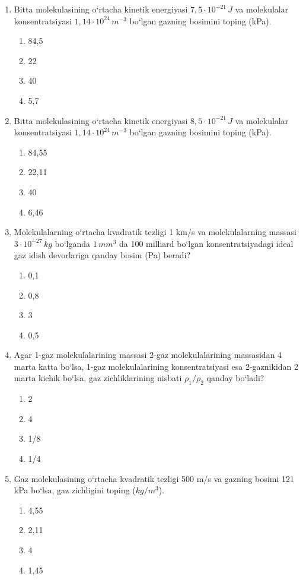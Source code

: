 \begin{enumerate}
\item Bitta molekulasining o‘rtacha kinetik energiyasi $7,5 \cdot 10^{-21} \, J$ va molekulalar konsentratsiyasi $1,14 \cdot 10^{24} \, m^{-3}$ bo‘lgan gazning bosimini toping (kPa).
\begin{enumerate}[label=\Alph*)]
\item 84,5
\item 22
\item 40
\item 5,7
\end{enumerate}

\item Bitta molekulasining o‘rtacha kinetik energiyasi $8,5 \cdot 10^{-21} \, J$ va molekulalar konsentratsiyasi $1,14 \cdot 10^{24} \, m^{-3}$ bo‘lgan gazning bosimini toping (kPa).
\begin{enumerate}[label=\Alph*)]
\item 84,55
\item 22,11
\item 40
\item 6,46
\end{enumerate}

\item Molekulalarning o‘rtacha kvadratik tezligi 1 km/s va molekulalarning massasi $3 \cdot 10^{-27} \, kg$ bo‘lganda $1 \, mm^3$ da 100 milliard bo‘lgan konsentratsiyadagi ideal gaz idish devorlariga qanday bosim (Pa) beradi?
\begin{enumerate}[label=\Alph*)]
\item 0,1
\item 0,8
\item 3
\item 0,5
\end{enumerate}

\item Agar 1-gaz molekulalarining massasi 2-gaz molekulalarining massasidan 4 marta katta bo‘lsa, 1-gaz molekulalarining konsentratsiyasi esa 2-gaznikidan 2 marta kichik bo‘lsa, gaz zichliklarining nisbati $\rho_1 / \rho_2$ qanday bo‘ladi?
\begin{enumerate}[label=\Alph*)]
\item 2
\item 4
\item 1/8
\item 1/4
\end{enumerate}

\item Gaz molekulasining o‘rtacha kvadratik tezligi 500 m/s va gazning bosimi 121 kPa bo‘lsa, gaz zichligini toping ($kg/m^3$).
\begin{enumerate}[label=\Alph*)]
\item 4,55
\item 2,11
\item 4
\item 1,45
\end{enumerate}


\end{enumerate}
